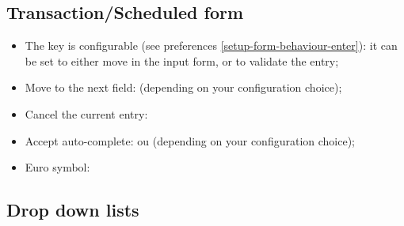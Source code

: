 \subsection{Transaction/Scheduled form}%

\begin{itemize}
	\item The  key is configurable (see preferences \vref{setup-form-behaviour-enter}): it can be set to either move in the input form, or to validate the entry;
	\item Move to the next field:  (depending on your configuration choice);
	\item Cancel the current entry: \keys{\esc}%
	\item Accept auto-complete:  ou  (depending on your configuration choice);
	\item Euro symbol: %
\end{itemize}


\subsection{Drop down lists}%

